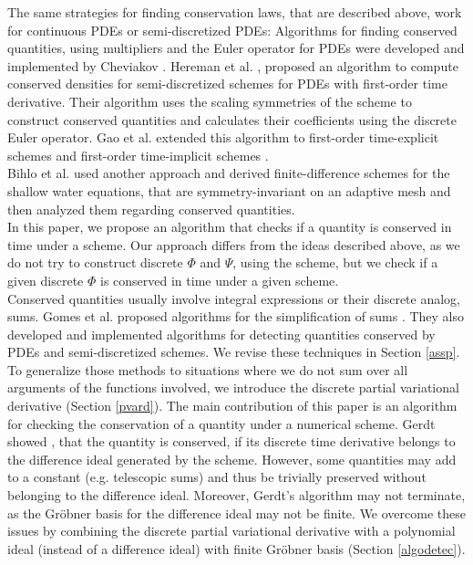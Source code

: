 \documentclass[manuscript]{acmart}
\newcommand{\1}{{\chi}}
\numberwithin{equation}{section}
\theoremstyle{thmlemcorr}
\numberwithin{theorem}{section}
\theoremstyle{thmlemcorr*}
\theoremstyle{defi}
\theoremstyle{remexample}
\theoremstyle{ass}
\begin{document}
The same strategies for finding conservation laws, that are described above, work for continuous PDEs or semi-discretized PDEs:
Algorithms for finding conserved quantities, using multipliers and the Euler operator for PDEs were developed and implemented by Cheviakov \cite{cheviakov07,cheviakov10}.
Hereman et al. \cite{hereman04,hereman08}, proposed an algorithm to compute conserved densities for semi-discretized schemes for PDEs with first-order time derivative. 
Their algorithm uses the scaling symmetries of the scheme to construct conserved quantities and calculates their coefficients using the discrete Euler operator.
Gao et al. extended this algorithm to first-order time-explicit schemes \cite{gao02} and first-order time-implicit schemes \cite{gao04}.\\
Bihlo et al. \cite{bihlo12} used another approach and derived finite-difference schemes for the shallow water equations, that are symmetry-invariant on an adaptive mesh and then analyzed them regarding conserved quantities.\\
In this paper, we propose an algorithm that checks if a quantity is conserved in time under a scheme. Our approach differs from the ideas described above, as we do not try to construct discrete $\Phi$ and $\Psi$, using the scheme, but we check if a given discrete $\Phi$ is conserved in time under a given scheme.\\
Conserved quantities usually involve integral expressions or their discrete analog, sums.
Gomes et al. proposed algorithms for the simplification of sums \cite{gomes20}.
They also developed and implemented algorithms for detecting quantities conserved by PDEs and semi-discretized schemes. 
We revise these techniques in Section \ref{assp}. 
To generalize those methods to situations where we do not sum over all arguments of the functions involved, we introduce the discrete partial variational derivative (Section \ref{pvard}).
The main contribution of this paper is an algorithm for checking the conservation of a quantity under a numerical scheme.
Gerdt showed \cite{gerdt12}, that the quantity is conserved, if its discrete time derivative belongs to the difference ideal generated by the scheme. However, some quantities may add to a constant (e.g. telescopic sums) and thus be trivially preserved without belonging to the difference ideal. Moreover, Gerdt's algorithm may not terminate, as the Gr{\"o}bner basis for the difference ideal may not be finite.
We overcome these issues by combining the discrete partial variational derivative with a polynomial ideal (instead of a difference ideal) with finite Gr{\"o}bner basis (Section \ref{algodetec}). 
\end{document}
